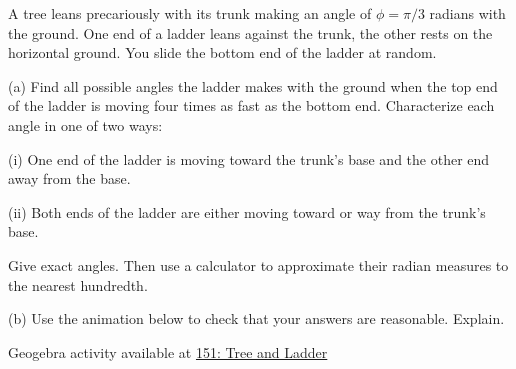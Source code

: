 \documentclass{ximera}
\begin{document}
\begin{question}  \label{QMMnd6793}
A tree leans precariously with its trunk making an angle of $\phi = \pi/3$ radians with the ground. One end of a ladder leans against the trunk, the other rests on the horizontal ground. You slide the bottom end of the ladder at random.

(a) Find all possible angles the ladder makes with the ground when the top end of the ladder is moving four times as fast as the bottom end. Characterize each angle in one of two ways:

(i) One end of the ladder is moving toward the trunk's base and the other end away from the base.

(ii) Both ends of the ladder are either moving toward or way from the trunk's base.

Give exact angles. Then use a calculator to approximate their radian measures to the nearest hundredth.

(b) Use the animation below to check that your answers are reasonable. Explain.


\begin{onlineOnly}
    \begin{center}
\end{center}
\end{onlineOnly}

Geogebra activity available at \href{https://www.desmos.com/calculator/2ppctyby1m}{151: Tree and Ladder}

\end{question}
\end{document}
